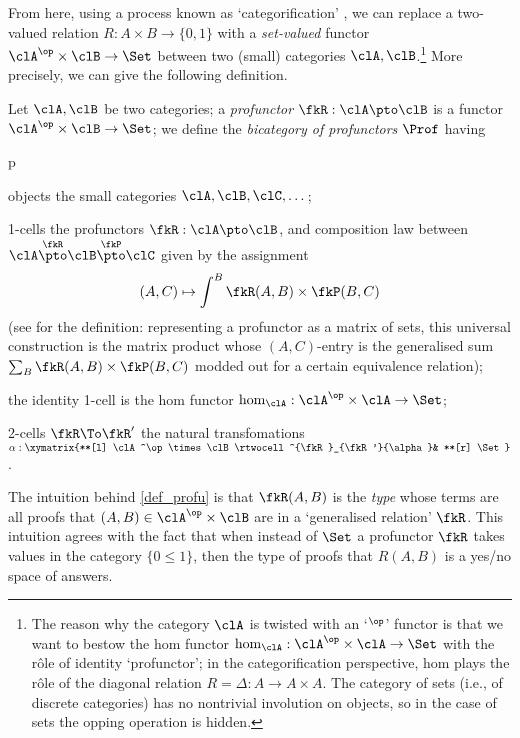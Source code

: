 From here, using a process known as `categorification' \cite{baez1998categorification}, we can replace a two-valued relation $R : A\times B \to \{0,1\}$ with a \emph{set-valued} functor $\clA^\op\times\clB \to \Set$ between two (small) categories $\clA,\clB$.\footnote{The reason why the category $\clA$ is twisted with an `$^\op$' functor is that we want to bestow the hom functor $\hom_{\clA} : \clA^\op\times\clA \to \Set$ with the r\^ole of identity `profunctor'; in the categorification perspective, hom plays the r\^ole of the diagonal relation $R=\Delta : A\to A\times A$. The category of sets (i.e., of discrete categories) has no nontrivial involution on objects, so in the case of sets the opping operation is hidden.} More precisely, we can give the following definition.
\begin{definition}[Profunctor]\label{def_profu}
	Let $\clA,\clB$ be two categories; a \emph{profunctor} $\fkR : \clA \pto \clB$ is a functor $\clA^\op\times\clB \to \Set$; we define the \emph{bicategory of profunctors} $\Prof$ having
	\begin{enumtag}{p}
		\item objects the small categories $\clA,\clB,\clC,\dots$;
		\item 1-cells the profunctors $\fkR : \clA \pto \clB$, and composition law between $\clA \overset{\fkR}{\pto} \clB \overset{\fkP}{\pto} \clC$ given by the assignment
		\[ (A,C)\mapsto \int^B \fkR(A,B)\times\fkP(B,C) \]
		(see \cite[6.2.10]{Bor2} for the definition: representing a profunctor as a matrix of sets, this universal construction is the matrix product whose $(A,C)$-entry is the generalised sum $\sum_B \fkR(A,B)\times\fkP(B,C)$ modded out for a certain equivalence relation); 
		\item the identity 1-cell is the hom functor $\hom_\clA : \clA^\op\times\clA \to \Set$;
		\item 2-cells $\fkR\To\fkR'$ the natural transfomations $\alpha : \xymatrix{**[l] \clA^\op\times\clB \rtwocell^{\fkR}_{\fkR'}{\alpha}& **[r] \Set}$.
	\end{enumtag}
\end{definition}
The intuition behind \autoref{def_profu} is that $\fkR(A,B)$ is the \emph{type} whose terms are all proofs that $(A,B)\in\clA^\op\times\clB$ are in a  `generalised relation' $\fkR$. This intuition agrees with the fact that when instead of $\Set$ a profunctor $\fkR$ takes values in the category $\{0\le 1\}$, then the type of proofs that $R(A,B)$ is a yes/no space of answers.


